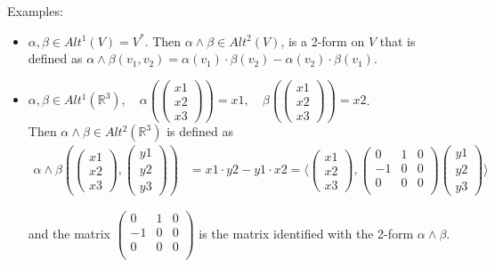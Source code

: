 \documentclass[11pt]{book} %
\begin{document}
Examples: 
\begin{itemize}
    \item $\alpha, \beta \in Alt^1(V) = V^*$. Then $\alpha \wedge \beta \in Alt^2(V)$, is a 2-form on \( V \) that is defined 
    as $\alpha \wedge \beta(v_1, v_2) = \alpha(v_1) \cdot \beta(v_2) - \alpha(v_2) \cdot \beta(v_1)$.
    
    
    \item $\alpha , \beta \in Alt^1(\mathbb{R}^3), \quad 
    \alpha ( \begin{pmatrix}
        x1 \\ x2 \\ x3
    \end{pmatrix}) = x1, \quad
    \beta ( \begin{pmatrix}
        x1 \\ x2 \\ x3
    \end{pmatrix}) = x2$. \\
    Then $\alpha \wedge \beta \in Alt^2(\mathbb{R}^3)$ is defined as
    \begin{align*}
        \alpha \wedge \beta ( \begin{pmatrix}
            x1 \\ x2 \\ x3
        \end{pmatrix}, \begin{pmatrix}
            y1 \\ y2 \\ y3
        \end{pmatrix}) &=  x1 \cdot y2 - y1 \cdot x2 = 
        \langle 
        \begin{pmatrix}
            x1 \\ x2 \\ x3
        \end{pmatrix}
        ,
        \begin{pmatrix}
            0 & 1 & 0 \\
            -1 & 0 & 0 \\
            0 & 0 & 0 \\
        \end{pmatrix}
        \begin{pmatrix}
            y1 \\ y2 \\ y3
        \end{pmatrix}
        \rangle
    \end{align*}

    and the matrix $\begin{pmatrix}
        0 & 1 & 0 \\
        -1 & 0 & 0 \\
        0 & 0 & 0 \\
    \end{pmatrix}$ is the matrix identified with the 2-form $\alpha \wedge \beta$.
\end{itemize}
\end{document}
